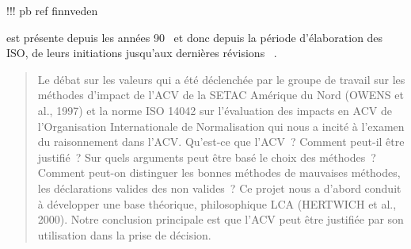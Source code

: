 !!! pb ref finnveden

est présente depuis les années 90~\cite{freidberg_behind_2015} et donc depuis la période d'élaboration des ISO, de leurs initiations jusqu'aux dernières révisions
~\cite{volkwein_valuation_1996,hertwich_decision-analytic_2001,hofstetter_value_2002}.
\blockcquote[traduction]{hertwich_decision-analytic_2001}{
Le débat sur les valeurs qui a été déclenchée par le groupe de travail sur les méthodes d'impact de l'ACV de la \gls{SETAC} Amérique du Nord (OWENS et al., 1997) et la norme ISO 14042 sur l'évaluation des impacts en ACV de l'Organisation Internationale de Normalisation qui nous a incité à l'examen du raisonnement dans l'ACV.
Qu'est-ce que l'ACV~?
Comment peut-il être justifié~?
Sur quels arguments peut être basé le choix des méthodes~?
Comment peut-on distinguer les bonnes méthodes de mauvaises méthodes, les déclarations valides des non valides~?
Ce projet nous a d'abord conduit à développer une base théorique, philosophique LCA (HERTWICH et al., 2000).
Notre conclusion principale est que l'ACV peut être justifiée par son utilisation dans la prise de décision.
}

